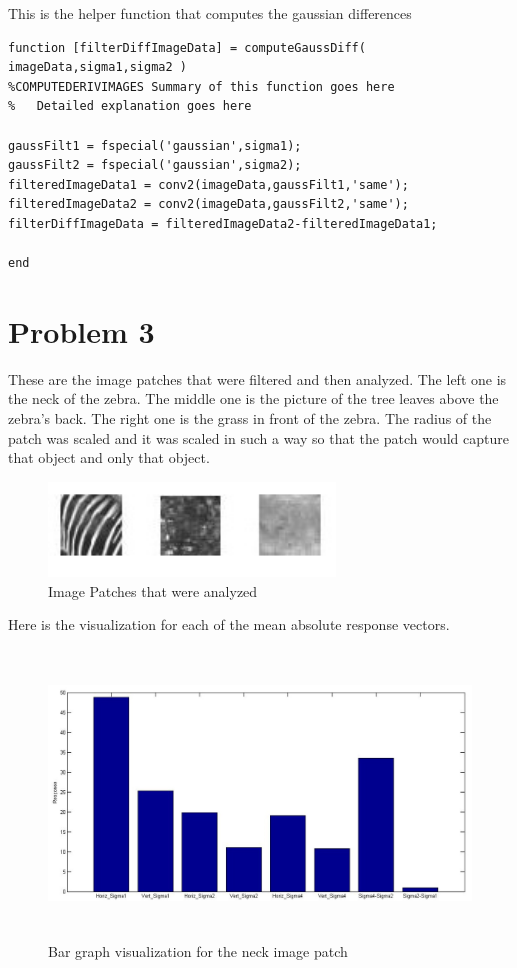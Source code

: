 \documentclass[11pt,psfig]{article}
\begin{document}
This is the helper function that computes the gaussian differences

\begin{verbatim}
function [filterDiffImageData] = computeGaussDiff( imageData,sigma1,sigma2 )
%COMPUTEDERIVIMAGES Summary of this function goes here
%   Detailed explanation goes here

gaussFilt1 = fspecial('gaussian',sigma1);
gaussFilt2 = fspecial('gaussian',sigma2);
filteredImageData1 = conv2(imageData,gaussFilt1,'same');
filteredImageData2 = conv2(imageData,gaussFilt2,'same');
filterDiffImageData = filteredImageData2-filteredImageData1;

end
\end{verbatim}

\newpage

\section*{Problem 3}

These are the image patches that were filtered and then analyzed. The left one is the neck of the zebra. The middle one is the picture of the tree leaves above the zebra's back. The right one is the grass in front of the zebra. The radius of the patch was scaled and it was scaled in such a way so that the patch would capture that object and only that object. 

\begin{figure}[H]
\centering
\includegraphics[width=3in]{prob3patches.jpg}
\caption{Image Patches that were analyzed}
\end{figure}

Here is the visualization for each of the mean absolute response vectors. 

\begin{figure}[H]
\centering
\includegraphics[height=3in]{prob3patch1bar.jpg}
\caption{Bar graph visualization for the neck image patch}
\end{figure}
\end{document}
